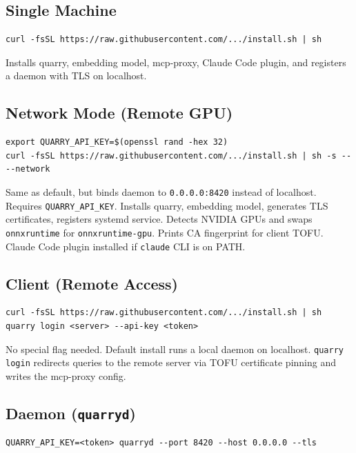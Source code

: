 \documentclass[a4paper,10pt]{article}
\begin{document}
\subsection{Single Machine}

\begin{lstlisting}
curl -fsSL https://raw.githubusercontent.com/.../install.sh | sh
\end{lstlisting}

Installs quarry, embedding model, mcp-proxy, Claude Code plugin, and
registers a daemon with TLS on localhost.

\subsection{Network Mode (Remote GPU)}

\begin{lstlisting}
export QUARRY_API_KEY=$(openssl rand -hex 32)
curl -fsSL https://raw.githubusercontent.com/.../install.sh | sh -s -- --network
\end{lstlisting}

Same as default, but binds daemon to \texttt{0.0.0.0:8420} instead of
localhost.  Requires \texttt{QUARRY\_API\_KEY}.  Installs quarry,
embedding model, generates TLS certificates, registers systemd service.
Detects NVIDIA GPUs and swaps \texttt{onnxruntime} for
\texttt{onnxruntime-gpu}.  Prints CA fingerprint for client TOFU.
Claude Code plugin installed if \texttt{claude} CLI is on PATH.

\subsection{Client (Remote Access)}

\begin{lstlisting}
curl -fsSL https://raw.githubusercontent.com/.../install.sh | sh
quarry login <server> --api-key <token>
\end{lstlisting}

No special flag needed.  Default install runs a local daemon on
localhost.  \texttt{quarry login} redirects queries to the remote
server via TOFU certificate pinning and writes the mcp-proxy config.

\subsection{Daemon (\texttt{quarryd})}

\begin{lstlisting}
QUARRY_API_KEY=<token> quarryd --port 8420 --host 0.0.0.0 --tls
\end{lstlisting}
\end{document}
